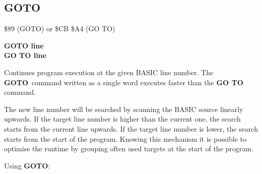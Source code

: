 \newpage
\subsection{GOTO}
\begin{description}[leftmargin=3cm,style=nextline]
\item [Token:] \$89 (GOTO) or \$CB \$A4 (GO TO)
\item [Format:] {\bf GOTO line} \\
                {\bf GO TO line}
\item [Usage:] Continues program
               execution at the given BASIC line number.
               The {\bf GOTO} command written as a single
               word executes faster than the {\bf GO TO} command.

\item [Remarks:] The new line number will be searched by scanning
               the BASIC source linearly upwards. If the target
               line number is higher than the current one, the
               search starts from the current line upwards.
               If the target line number is lower, the search starts
               from the start of the program.
               Knowing this mechanism it is possible to optimise
               the runtime by grouping often used targets at the
               start of the program.

\item [Example:] Using {\bf GOTO}:
\end{description}


\newpage
